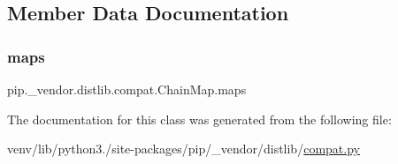 \subsection{Member Data Documentation}
\mbox{\label{classpip_1_1__vendor_1_1distlib_1_1compat_1_1ChainMap_a00c70d531abd661a7593f8b48e09a2e9}} 
\subsubsection{\texorpdfstring{maps}{maps}}
{\footnotesize\ttfamily pip.\+\_\+vendor.\+distlib.\+compat.\+Chain\+Map.\+maps}



The documentation for this class was generated from the following file\+:\begin{DoxyCompactItemize}
\item 
venv/lib/python3./site-\/packages/pip/\+\_\+vendor/distlib/\hyperlink{__vendor_2distlib_2compat_8py}{compat.\+py}\end{DoxyCompactItemize}
